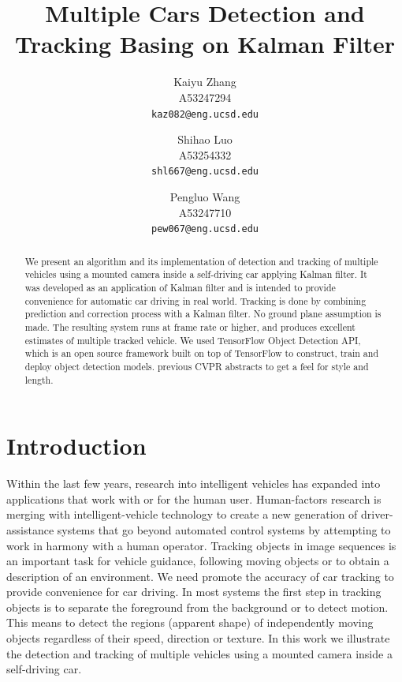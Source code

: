 \documentclass[10pt,twocolumn,letterpaper]{article}
\begin{document}
\title{Multiple Cars Detection and Tracking Basing on Kalman Filter}

\author{Kaiyu Zhang\\
A53247294\\
{\tt\small kaz082@eng.ucsd.edu}
\and
Shihao Luo\\
A53254332\\
{\tt\small shl667@eng.ucsd.edu}
\and
Pengluo Wang\\
A53247710\\
{\tt\small pew067@eng.ucsd.edu}
}
\maketitle

\begin{abstract}
We present an algorithm and its implementation of detection and tracking of multiple vehicles using a mounted camera inside a self-driving car applying Kalman filter. It was developed as an application of Kalman filter and is intended to provide convenience for automatic car driving in real world. Tracking is done by combining prediction and correction process with a
Kalman filter. No ground plane
assumption is made. The resulting system runs at frame rate or higher, and produces excellent estimates of multiple tracked vehicle. We used TensorFlow Object Detection API, which is an open source framework built on top of TensorFlow to construct, train and deploy object detection models. previous CVPR abstracts to get a feel for style and length.
\end{abstract}

\section{Introduction}

Within the last few years, research into intelligent vehicles has expanded into applications that work with or for the human user. Human-factors research is merging with intelligent-vehicle technology to create a new generation of driver-assistance systems that go beyond automated control systems by attempting to work in harmony with a human operator. Tracking objects in image sequences is an important task for
vehicle guidance, following moving objects or to obtain a description
of an environment. We need promote the accuracy of car tracking to provide convenience for car driving. In most systems the first step in
tracking objects is to separate the foreground from the background
or to detect motion. This means to detect the regions
(apparent shape) of independently moving objects regardless
of their speed, direction or texture. In this work we illustrate the detection and tracking of multiple vehicles using a mounted camera inside a self-driving car. 
\end{document}
